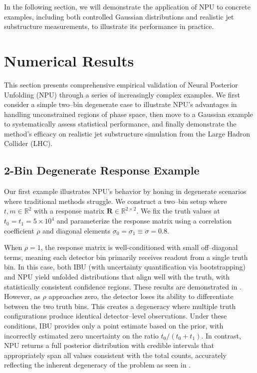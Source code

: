 In the following section, we will demonstrate the application of NPU to concrete examples, including both controlled Gaussian distributions and realistic jet substructure measurements, to illustrate its performance in practice.
\section{Numerical Results}
    This section presents comprehensive empirical validation of Neural Posterior Unfolding (NPU) through a series of increasingly complex examples.
    We first consider a simple two--bin degenerate case to illustrate NPU's advantages in handling unconstrained regions of phase space, then move to a Gaussian example to systematically assess statistical performance, and finally demonstrate the method's efficacy on realistic jet substructure simulation from the Large Hadron Collider (LHC).
    \subsection{2-Bin Degenerate Response Example}
        Our first example illustrates NPU's behavior by honing in degenerate scenarios where traditional methods struggle.
        We construct a two--bin setup where $t, m \in \mathbb{R}^2$ with a response matrix $\mathbf{R} \in \mathbb{R}^{2 \times 2}$.
        We fix the truth values at $t_0 = t_1 = 5 \times 10^4$ and parameterize the response matrix using a correlation coefficient $\rho$ and diagonal elements $\sigma_0 = \sigma_1 \equiv \sigma = 0.8$.

        When $\rho = 1$, the response matrix is well-conditioned with small off--diagonal terms, meaning each detector bin primarily receives readout from a single truth bin.
        In this case, both IBU (with uncertainty quantification via bootstrapping) and NPU yield unfolded distributions that align well with the truth, with statistically consistent confidence regions.
        These results are demonstrated in .
        However, as $\rho$ approaches zero, the detector loses its ability to differentiate between the two truth bins.
        This creates a degeneracy where multiple truth configurations produce identical detector--level observations.
        Under these conditions, IBU provides only a point estimate based on the prior, with incorrectly estimated zero uncertainty on the ratio $t_0/(t_0+t_1)$.
        In contrast, NPU returns a full posterior distribution with credible intervals that appropriately span all values consistent with the total counts, accurately reflecting the inherent degeneracy of the problem as seen in .

